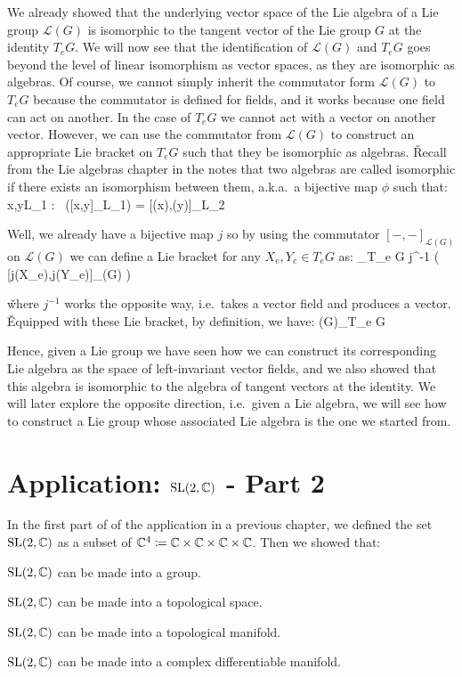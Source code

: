 We already showed that the underlying vector space of the Lie algebra of a Lie group $\mathcal{L}(G)$ is isomorphic
to the tangent vector of the Lie group $G$ at the identity $T_e G$. We will now see that the identification of
$\mathcal{L}(G)$ and $T_e G$ goes beyond the level of linear isomorphism as vector spaces, as they are isomorphic as
algebras. Of course, we cannot simply inherit the commutator form $\mathcal{L}(G)$ to $T_e G$ because the commutator
is defined for fields, and it works because one field can act on another. In the case of $T_e G$ we cannot act with a
vector on another vector. However, we can use the commutator from $\mathcal{L}(G)$ to construct an appropriate Lie
bracket on $T_e G$ such that they be isomorphic as algebras. \v

Recall from the Lie algebras chapter in the notes that two algebras are called isomorphic if there exists an
isomorphism between them, a.k.a.\ a bijective map $\phi$ such that:
\bse
\forall \, x,y\in L_1 : \ \phi([x,y]_{L_1}) = [\phi(x),\phi(y)]_{L_2}
\ese

Well, we already have a bijective map $j$ so by using the commutator $[-, -]_{\mathcal{L}(G)}$ on $\mathcal{L}(G)$ we
can define a Lie bracket for any $X_e, Y_e \in T_e G$ as:
\bse
[X_e,Y_e]_{T_e G} \coloneqq j^{-1} \bigl( [j(X_e),j(Y_e)]_{(G)} \bigr)
\ese

\v

where $j^{-1} $ works the opposite way, i.e.\ takes a vector field and produces a vector. \v

Equipped with these Lie bracket, by definition, we have:
\bse
{}(G)\cong_T_e G
\ese

Hence, given a Lie group we have seen how we can construct its corresponding Lie algebra as the space of
left-invariant vector fields, and we also showed that this algebra is isomorphic to the algebra of tangent vectors at
the identity. We will later explore the opposite direction, i.e.\ given a Lie algebra, we will see how to construct a
Lie group whose associated Lie algebra is the one we started from.

\section{Application: $\operatorname{SL}(2,\mathbb{C})$ - Part 2}

In the first part of of the application in a previous chapter, we defined the set $\operatorname{SL}(2,\mathbb{C})$ as a subset of $\mathbb{C}^4
\coloneqq \mathbb{C}\times\mathbb{C}\times\mathbb{C}\times\mathbb{C}$. Then we showed that:
\bit
\item $\operatorname{SL}(2,\mathbb{C})$ can be made into a group.
\item $\operatorname{SL}(2,\mathbb{C})$ can be made into a topological space.
\item $\operatorname{SL}(2,\mathbb{C})$ can be made into a topological manifold.
\item $\operatorname{SL}(2,\mathbb{C})$ can be made into a complex differentiable manifold.
\eit

